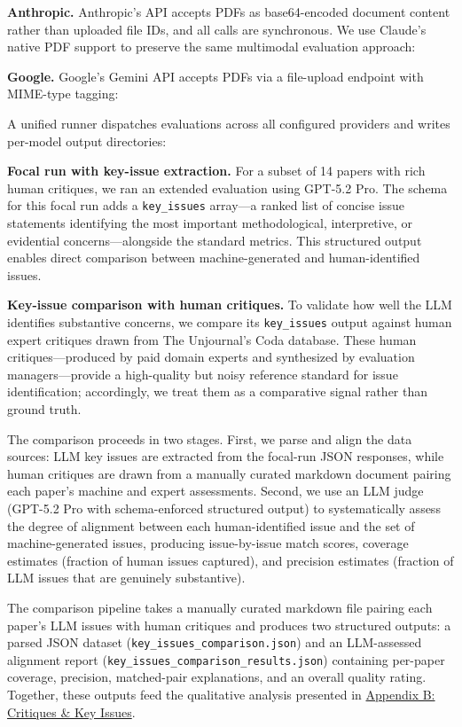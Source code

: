 \documentclass[
  11pt,
  letterpaper,
]{article}
\begin{document}
\textbf{Anthropic.} Anthropic's API accepts PDFs as base64-encoded
document content rather than uploaded file IDs, and all calls are
synchronous. We use Claude's native PDF support to preserve the same
multimodal evaluation approach:

\textbf{Google.} Google's Gemini API accepts PDFs via a file-upload
endpoint with MIME-type tagging:

A unified runner dispatches evaluations across all configured providers
and writes per-model output directories:

\textbf{Focal run with key-issue extraction.} For a subset of 14 papers
with rich human critiques, we ran an extended evaluation using GPT-5.2
Pro. The schema for this focal run adds a \texttt{key\_issues} array---a
ranked list of concise issue statements identifying the most important
methodological, interpretive, or evidential concerns---alongside the
standard metrics. This structured output enables direct comparison
between machine-generated and human-identified issues.

\textbf{Key-issue comparison with human critiques.} To validate how well
the LLM identifies substantive concerns, we compare its
\texttt{key\_issues} output against human expert critiques drawn from
The Unjournal's Coda database. These human critiques---produced by paid
domain experts and synthesized by evaluation managers---provide a
high-quality but noisy reference standard for issue identification;
accordingly, we treat them as a comparative signal rather than ground
truth.

The comparison proceeds in two stages. First, we parse and align the
data sources: LLM key issues are extracted from the focal-run JSON
responses, while human critiques are drawn from a manually curated
markdown document pairing each paper's machine and expert assessments.
Second, we use an LLM judge (GPT-5.2 Pro with schema-enforced structured
output) to systematically assess the degree of alignment between each
human-identified issue and the set of machine-generated issues,
producing issue-by-issue match scores, coverage estimates (fraction of
human issues captured), and precision estimates (fraction of LLM issues
that are genuinely substantive).

The comparison pipeline takes a manually curated markdown file pairing
each paper's LLM issues with human critiques and produces two structured
outputs: a parsed JSON dataset (\texttt{key\_issues\_comparison.json})
and an LLM-assessed alignment report
(\texttt{key\_issues\_comparison\_results.json}) containing per-paper
coverage, precision, matched-pair explanations, and an overall quality
rating. Together, these outputs feed the qualitative analysis presented
in \href{results_critiques.qmd}{Appendix B: Critiques \& Key Issues}.
\end{document}
